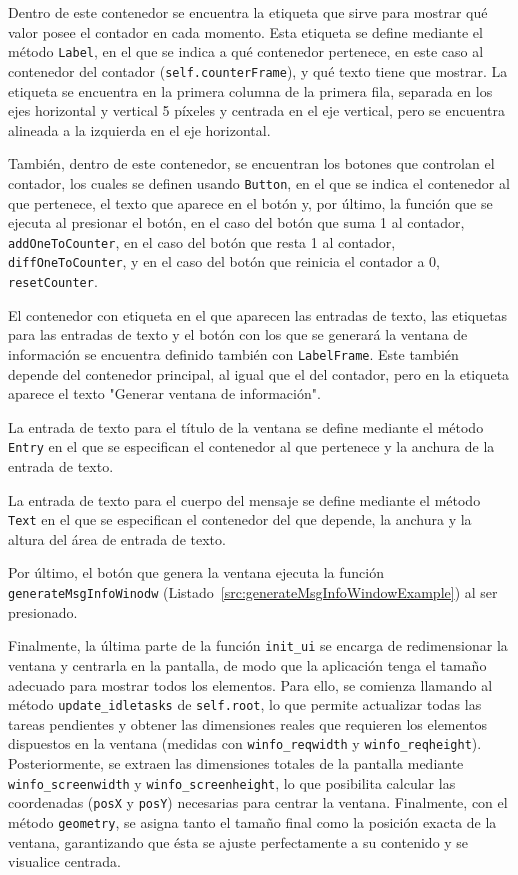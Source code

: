 Dentro de este contenedor se encuentra la etiqueta que sirve para mostrar qué valor posee el contador en cada momento. Esta etiqueta se define mediante el método \texttt{Label}, en el que se indica a qué contenedor pertenece, en este caso al contenedor del contador (\texttt{self.counterFrame}), y qué texto tiene que mostrar. La etiqueta se encuentra en la primera columna de la primera fila, separada en los ejes horizontal y vertical 5 píxeles y centrada en el eje vertical, pero se encuentra alineada a la izquierda en el eje horizontal.

También, dentro de este contenedor, se encuentran los botones que controlan el contador, los cuales se definen usando \texttt{Button}, en el que se indica el contenedor al que pertenece, el texto que aparece en el botón y, por último, la función que se ejecuta al presionar el botón, en el caso del botón que suma 1 al contador, \texttt{addOneToCounter}, en el caso del botón que resta 1 al contador, \texttt{diffOneToCounter}, y en el caso del botón que reinicia el contador a 0, \texttt{resetCounter}.

El contenedor con etiqueta en el que aparecen las entradas de texto, las etiquetas para las entradas de texto y el botón con los que se generará la ventana de información se encuentra definido también con \texttt{LabelFrame}. Este también depende del contenedor principal, al igual que el del contador, pero en la etiqueta aparece el texto "Generar ventana de información".

La entrada de texto para el título de la ventana se define mediante el método \texttt{Entry} en el que se especifican el contenedor al que pertenece y la anchura de la entrada de texto.

La entrada de texto para el cuerpo del mensaje se define mediante el método \texttt{Text} en el que se especifican el contenedor del que depende, la anchura y la altura del área de entrada de texto.

Por último, el botón que genera la ventana ejecuta la función \texttt{generateMsgInfoWinodw} (Listado~\ref{src:generateMsgInfoWindowExample}) al ser presionado.

Finalmente, la última parte de la función \texttt{init\_ui} se encarga de redimensionar la ventana y centrarla en la pantalla, de modo que la aplicación tenga el tamaño adecuado para mostrar todos los elementos. Para ello, se comienza llamando al método \texttt{update\_idletasks} de \texttt{self.root}, lo que permite actualizar todas las tareas pendientes y obtener las dimensiones reales que requieren los elementos dispuestos en la ventana (medidas con \texttt{winfo\_reqwidth} y \texttt{winfo\_reqheight}). Posteriormente, se extraen las dimensiones totales de la pantalla mediante \texttt{winfo\_screenwidth} y \texttt{winfo\_screenheight}, lo que posibilita calcular las coordenadas (\texttt{posX} y \texttt{posY}) necesarias para centrar la ventana. Finalmente, con el método \texttt{geometry}, se asigna tanto el tamaño final como la posición exacta de la ventana, garantizando que ésta se ajuste perfectamente a su contenido y se visualice centrada.

